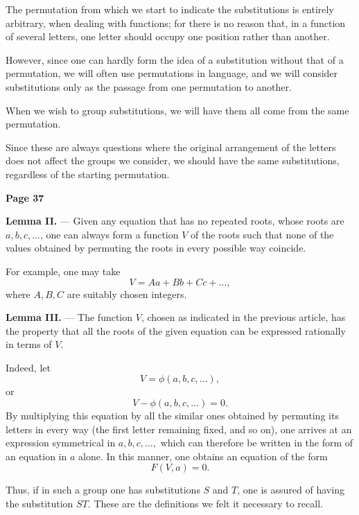 \documentclass{article}
\begin{document}
The permutation from which we start to indicate the substitutions is entirely arbitrary, when dealing with functions; for there is no reason that, in a function of several letters, one letter should occupy one position rather than another.

\smallskip

However, since one can hardly form the idea of a substitution without that of a permutation, we will often use permutations in language, and we will consider substitutions only as the passage from one permutation to another.

\smallskip

When we wish to group substitutions, we will have them all come from the same permutation.

\smallskip

Since these are always questions where the original arrangement of the letters does not affect the groups we consider, we should have the same substitutions, regardless of the starting permutation.


\textbf{Page 37}

\medskip

\noindent
\textbf{Lemma II.} --- Given any equation that has no repeated roots, whose roots are \(a, b, c, \dots\), one can always form a function \(V\) of the roots such that none of the values obtained by permuting the roots in every possible way coincide.

\smallskip

\noindent
For example, one may take
\[
V = Aa + Bb + Cc + \dots,
\]
where \(A, B, C\) are suitably chosen integers.

\medskip

\noindent
\textbf{Lemma III.} --- The function \(V\), chosen as indicated in the previous article, has the property that all the roots of the given equation can be expressed rationally in terms of \(V\).

\smallskip

\noindent
Indeed, let
\[
V = \phi(a, b, c, \dots),
\]
or
\[
V - \phi(a, b, c, \dots) = 0.
\]
By multiplying this equation by all the similar ones obtained by permuting its letters in every way (the first letter remaining fixed, and so on), one arrives at an expression symmetrical in \(a, b, c, \dots,\) which can therefore be written in the form of an equation in \(a\) alone. In this manner, one obtains an equation of the form
\[
F(V, a) = 0.
\]

\smallskip

\noindent
Thus, if in such a group one has substitutions \(S\) and \(T\), one is assured of having the substitution \(ST\). These are the definitions we felt it necessary to recall.
\end{document}
